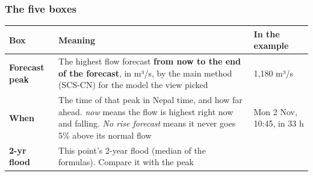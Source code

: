 \documentclass[
  10pt,
]{article}
\begin{document}
\hypertarget{the-five-boxes}{%
\subsubsection{The five boxes}\label{the-five-boxes}}

\begin{longtable}[]{@{}lll@{}}
\toprule
\begin{minipage}[b]{0.30\columnwidth}\raggedright
Box\strut
\end{minipage} & \begin{minipage}[b]{0.30\columnwidth}\raggedright
Meaning\strut
\end{minipage} & \begin{minipage}[b]{0.30\columnwidth}\raggedright
In the example\strut
\end{minipage}\tabularnewline
\midrule
\endhead
\begin{minipage}[t]{0.30\columnwidth}\raggedright
\textbf{Forecast peak}\strut
\end{minipage} & \begin{minipage}[t]{0.30\columnwidth}\raggedright
The highest flow forecast \textbf{from now to the end of the forecast},
in m³/s, by the main method (SCS-CN) for the model the view picked\strut
\end{minipage} & \begin{minipage}[t]{0.30\columnwidth}\raggedright
1,180 m³/s\strut
\end{minipage}\tabularnewline
\begin{minipage}[t]{0.30\columnwidth}\raggedright
\textbf{When}\strut
\end{minipage} & \begin{minipage}[t]{0.30\columnwidth}\raggedright
The time of that peak in Nepal time, and how far ahead. \emph{now} means
the flow is highest right now and falling. \emph{No rise forecast} means
it never goes 5\% above its normal flow\strut
\end{minipage} & \begin{minipage}[t]{0.30\columnwidth}\raggedright
Mon 2 Nov, 10:45, in 33 h\strut
\end{minipage}\tabularnewline
\begin{minipage}[t]{0.30\columnwidth}\raggedright
\textbf{2-yr flood}\strut
\end{minipage} & \begin{minipage}[t]{0.30\columnwidth}\raggedright
This point's 2-year flood (median of the formulas). Compare it with the
peak\strut
\end{minipage} & \begin{minipage}[t]{0.30\columnwidth}\raggedright

\end{minipage}
\end{longtable}
\end{document}
